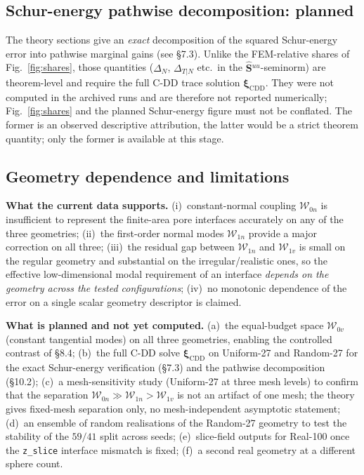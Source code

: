 \documentclass[11pt,a4paper]{article}
\newcommand{\Schur}{\mathbf{S}}
\newcommand{\Shatuu}{\widehat{\Schur}{}^{uu}}
\newcommand{\Wspace}{\mathcal{W}}
\newcommand{\xiX}[1]{\bm{\xi}_{#1}}
\begin{document}
\subsection{Schur-energy pathwise decomposition: planned}
\label{sec:schurdecomp}

The theory sections give an \emph{exact} decomposition of the squared
Schur-energy error into pathwise marginal gains (see \S7.3).  Unlike
the FEM-relative shares of Fig.~\ref{fig:shares}, those quantities
($\Delta_N$, $\Delta_{T|N}$ etc.\ in the $\Shatuu$-seminorm) are
theorem-level and require the full C-DD trace solution
$\xiX{\mathrm{CDD}}$.  They were not computed in the archived runs and
are therefore not reported numerically; Fig.~\ref{fig:shares} and the
planned Schur-energy figure must not be conflated.  The former is an
observed descriptive attribution, the latter would be a strict theorem
quantity; only the former is available at this stage.

\subsection{Geometry dependence and limitations}
\label{sec:limitations}

\textbf{What the current data supports.}  (i)~constant-normal coupling
$\Wspace_{0n}$ is insufficient to represent the finite-area pore
interfaces accurately on any of the three geometries; (ii)~the
first-order normal modes $\Wspace_{1n}$ provide a major correction on
all three; (iii)~the residual gap between $\Wspace_{1n}$ and
$\Wspace_{1v}$ is small on the regular geometry and substantial on the
irregular/realistic ones, so the effective low-dimensional modal
requirement of an interface \emph{depends on the geometry across the
tested configurations}; (iv)~no monotonic dependence of the error on a
single scalar geometry descriptor is claimed.

\textbf{What is planned and not yet computed.}  (a)~the equal-budget
space $\Wspace_{0v}$ (constant tangential modes) on all three
geometries, enabling the controlled contrast of \S8.4;
(b)~the full C-DD solve $\xiX{\mathrm{CDD}}$ on Uniform-27 and
Random-27 for the exact Schur-energy verification (\S7.3) and the
pathwise decomposition (\S10.2); (c)~a mesh-sensitivity study
(Uniform-27 at three mesh levels) to confirm that the separation
$\Wspace_{0n}\gg\Wspace_{1n}>\Wspace_{1v}$ is not an artifact of one
mesh; the theory gives fixed-mesh separation only, no
mesh-independent asymptotic statement; (d)~an ensemble of random
realisations of the Random-27 geometry to test the stability of the
$59/41$ split across seeds; (e)~slice-field outputs for Real-100 once
the \texttt{z\_slice} interface mismatch is fixed; (f)~a second real
geometry at a different sphere count.
\end{document}
